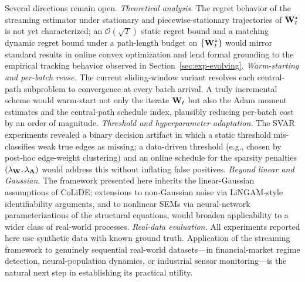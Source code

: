 \documentclass[journal,twoside]{IEEEtran}
\begin{document}
Several directions remain open. \emph{Theoretical analysis.} The
regret behavior of the streaming estimator under stationary and
piecewise-stationary trajectories of ${\mathbf W}^\star_t$ is not yet
characterized; an $\mathcal{O}(\sqrt{T})$ static regret bound and a
matching dynamic regret bound under a path-length budget on
$\{{\mathbf W}^\star_t\}$ would mirror standard results in online convex
optimization and lend formal grounding to the empirical tracking
behavior observed in Section~\ref{sec:exp-evolving}.
\emph{Warm-starting and per-batch reuse.} The current sliding-window
variant resolves each central-path subproblem to convergence
at every batch arrival. A truly incremental scheme would
warm-start not only the iterate ${\mathbf W}_t$ but also the Adam moment
estimates and the central-path schedule index, plausibly
reducing per-batch cost by an order of magnitude. \emph{Threshold and
hyperparameter adaptation.} The SVAR experiments revealed a binary
decision artifact in which a static threshold mis-classifies weak
true edges as missing; a data-driven threshold (e.g., chosen by
post-hoc edge-weight clustering) and an online schedule for the
sparsity penalties $(\lambda_{{\mathbf W}}, \lambda_{{\mathbf A}})$ would
address this without inflating false positives.
\emph{Beyond linear and Gaussian.} The framework presented here
inherits the linear-Gaussian assumptions of CoLiDE; extensions to
non-Gaussian noise via LiNGAM-style identifiability arguments, and to
nonlinear SEMs via neural-network parameterizations of the structural
equations, would broaden applicability to a wider class of real-world
processes. \emph{Real-data evaluation.} All experiments reported here
use synthetic data with known ground truth. Application of the
streaming framework to genuinely sequential real-world datasets---in
financial-market regime detection, neural-population dynamics, or
industrial sensor monitoring---is the natural next step in
establishing its practical utility.





\end{document}
